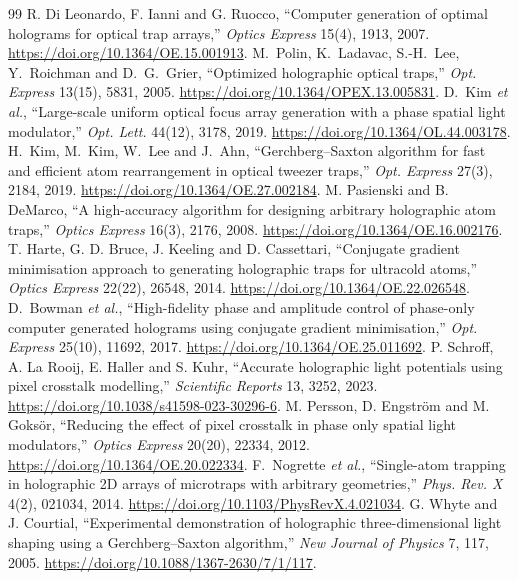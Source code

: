 \begin{thebibliography}{99}\small
{} R. Di Leonardo, F. Ianni and G. Ruocco, ``Computer generation of optimal holograms for optical trap arrays,'' \emph{Optics Express} 15(4), 1913, 2007. \url{https://doi.org/10.1364/OE.15.001913}.
 M.~Polin, K.~Ladavac, S.-H.~Lee, Y.~Roichman and D.~G.~Grier, ``Optimized holographic optical traps,'' \emph{Opt. Express} 13(15), 5831, 2005. \url{https://doi.org/10.1364/OPEX.13.005831}.
 D.~Kim \emph{et al.}, ``Large-scale uniform optical focus array generation with a phase spatial light modulator,'' \emph{Opt. Lett.} 44(12), 3178, 2019. \url{https://doi.org/10.1364/OL.44.003178}.
 H.~Kim, M.~Kim, W.~Lee and J.~Ahn, ``Gerchberg--Saxton algorithm for fast and efficient atom rearrangement in optical tweezer traps,'' \emph{Opt. Express} 27(3), 2184, 2019. \url{https://doi.org/10.1364/OE.27.002184}.
 M. Pasienski and B. DeMarco, ``A high-accuracy algorithm for designing arbitrary holographic atom traps,'' \emph{Optics Express} 16(3), 2176, 2008. \url{https://doi.org/10.1364/OE.16.002176}.
 T. Harte, G. D. Bruce, J. Keeling and D. Cassettari, ``Conjugate gradient minimisation approach to generating holographic traps for ultracold atoms,'' \emph{Optics Express} 22(22), 26548, 2014. \url{https://doi.org/10.1364/OE.22.026548}.
 D.~Bowman \emph{et al.}, ``High-fidelity phase and amplitude control of phase-only computer generated holograms using conjugate gradient minimisation,'' \emph{Opt. Express} 25(10), 11692, 2017. \url{https://doi.org/10.1364/OE.25.011692}.
 P. Schroff, A. La Rooij, E. Haller and S. Kuhr, ``Accurate holographic light potentials using pixel crosstalk modelling,'' \emph{Scientific Reports} 13, 3252, 2023. \url{https://doi.org/10.1038/s41598-023-30296-6}.
 M. Persson, D. Engstr\"om and M. Goks\"or, ``Reducing the effect of pixel crosstalk in phase only spatial light modulators,'' \emph{Optics Express} 20(20), 22334, 2012. \url{https://doi.org/10.1364/OE.20.022334}.
 F.~Nogrette \emph{et al.}, ``Single-atom trapping in holographic 2D arrays of microtraps with arbitrary geometries,'' \emph{Phys. Rev. X} 4(2), 021034, 2014. \url{https://doi.org/10.1103/PhysRevX.4.021034}.
 G. Whyte and J. Courtial, ``Experimental demonstration of holographic three-dimensional light shaping using a Gerchberg--Saxton algorithm,'' \emph{New Journal of Physics} 7, 117, 2005. \url{https://doi.org/10.1088/1367-2630/7/1/117}.

\end{thebibliography}
